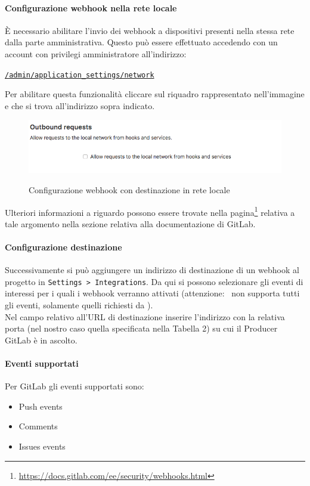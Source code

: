 	\paragraph{Configurazione webhook nella rete locale}
	È necessario abilitare l'invio dei webhook a dispositivi presenti nella stessa rete dalla parte amministrativa.
	Questo può essere effettuato accedendo con un account con privilegi amministratore all'indirizzo:
	\begin{center}
		\texttt{\url{/admin/application_settings/network}}
	\end{center}
	Per abilitare questa funzionalità cliccare sul riquadro rappresentato nell'immagine e che si trova all'indirizzo sopra indicato.
	\begin{figure}[H]
		\centering
		\includegraphics[width=13cm]{img/webhook_gitlab_setup.png}\\
		\caption{Configurazione webhook con destinazione in rete locale}
	\end{figure}
	Ulteriori informazioni a riguardo possono essere trovate nella pagina\footnote{\url{https://docs.gitlab.com/ee/security/webhooks.html}} relativa a tale argomento nella sezione relativa alla documentazione di GitLab.	

	\paragraph{Configurazione destinazione}
	Successivamente si può aggiungere un indirizzo di destinazione di un webhook al progetto in \texttt{Settings > Integrations}.
	Da qui si possono selezionare gli eventi di interessi per i quali i webhook verranno attivati (attenzione: \progetto~non supporta tutti gli eventi, solamente quelli richiesti da \II).\\
	Nel campo relativo all'URL di destinazione inserire l'indirizzo con la relativa porta (nel nostro caso quella specificata nella Tabella 2) su cui il Producer GitLab è in ascolto.
	\paragraph{Eventi supportati}
	Per GitLab gli eventi supportati sono:
	\begin{itemize}
		\item Push events
		\item Comments
		\item Issues events
	\end{itemize}

